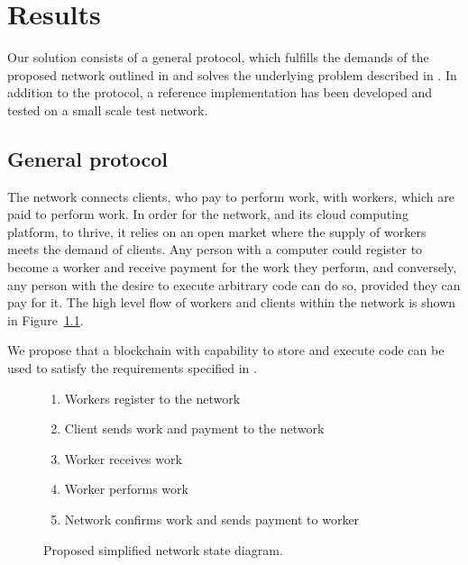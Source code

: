 \chapter{Results}
Our solution consists of a general protocol, which fulfills the demands of the proposed network outlined in  and solves the underlying problem described in .
In addition to the protocol, a reference implementation has been developed and tested on a small scale test network.

\section{General protocol}
\label{sec:res:protocol}
The network connects clients, who pay to perform work, with workers, which are paid to perform work. In order for the network, and its cloud computing platform, to thrive, it relies on an open market where the supply of workers meets the demand of clients. Any person with a computer could register to become a worker and receive payment for the work they perform, and conversely, any person with the desire to execute arbitrary code can do so, provided they can pay for it. The high level flow of workers and clients within the network is shown in Figure~\ref{network-schema}.

We propose that a blockchain with capability to store and execute code can be used to satisfy the requirements specified in .

\begin{figure}[ht]
\centering
{}

\begin{enumerate}
\item Workers register to the network
\item Client sends work and payment to the network
\item Worker receives work
\item Worker performs work
\item Network confirms work and sends payment to worker
\end{enumerate}
\caption{Proposed simplified network state diagram.}
\label{network-schema}
\end{figure}

